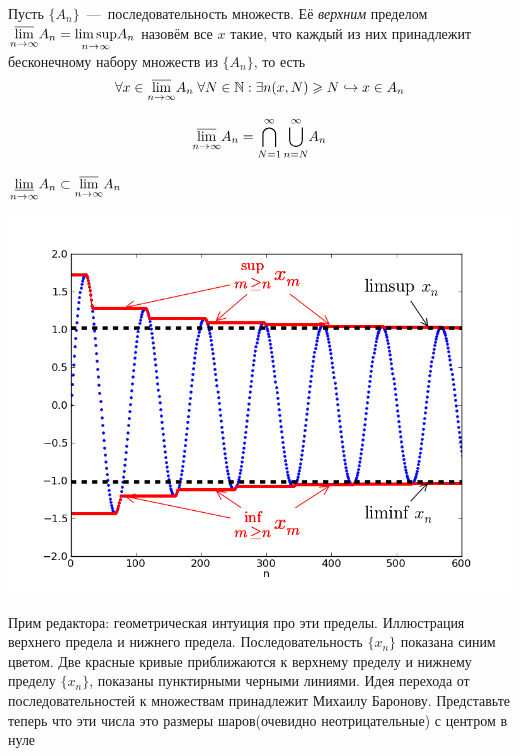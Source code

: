\begin{definition}
    Пусть $\{A_n\}$~---~последовательность множеств. Её \textit{верхним} пределом $\underset{n \rightarrow \infty}{\overline{\lim}} A_n = \underset{n \rightarrow \infty}{\limsup} A_n$ назовём все $x$ такие, что каждый из них принадлежит бесконечному набору множеств из $\{A_n\}$, то есть 
     \[\forall x \in \underset{n \rightarrow \infty}{\overline{\lim}} A_n \; \forall N \in \mathbb{N} : \exists n(x, N) \geqslant N \hookrightarrow x \in A_n\]
    
    \[\underset{n \rightarrow \infty}{\overline{\lim}} A_n = \overset{\infty}{\underset{N = 1}{\bigcap}} \, \overset{\infty}{\underset{n = N}{\bigcup}}A_n\]
\end{definition}

\begin{proposition}
    $\underset{n \rightarrow \infty}{\underline{\lim}} A_n \subset \underset{n \rightarrow \infty}{\overline{\lim}} A_n$\
\end{proposition}

\begin{minipage}{0.5\textwidth}%
    \includegraphics[width=1.0\textwidth]{images/Lim_sup_example_5.png} 
\end{minipage}%
\hfill%
\begin{minipage}{0.5\textwidth}\raggedright
Прим редактора: геометрическая интуиция про эти пределы. Иллюстрация верхнего предела и нижнего предела. Последовательность $\{x_n\}$ показана синим цветом. Две красные кривые приближаются к верхнему пределу и нижнему пределу $\{x_n\}$, показаны пунктирными черными линиями. 
Идея перехода от последовательностей к множествам принадлежит Михаилу Баронову. Представьте теперь что эти числа это размеры шаров(очевидно неотрицательные) с центром в нуле
\end{minipage}

